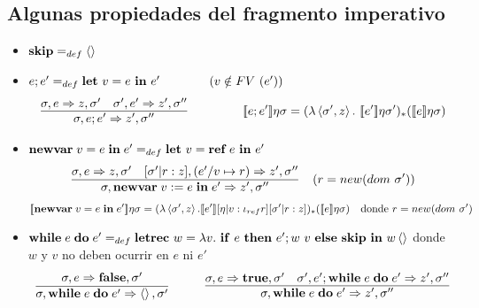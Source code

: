     \subsection{Algunas propiedades del fragmento imperativo}
    \begin{itemize}
      \item $\textbf{skip} =_{def} \left\langle \right\rangle$
      \item $e;e' =_{def} \textbf{let}\ v=e \ \mathbf{in}\  e'\qquad\qquad(v\notin FV\ (e'))$
        \begin{eqnarray*}
          \begin{array}{c}
            \underline{\s,e \Rightarrow z,\s'\quad \s',e' \Rightarrow z',\s''}\\
            \s, e;e' \Rightarrow z',\s''
            \end{array} \qquad \qquad 
            \se{e;e'}\eta\s = (\lambda \la\s',z\ra.\ \se{e'}\eta\s')_*(\se{e}\eta\s)
        \end{eqnarray*}
      \item $\newvar{v=e}{e'} =_{def} \textbf{let}\ v=\textbf{ref}\ e \ine e'$
        \[\begin{array}{c}
        \underline{\sigma,e \Rightarrow z,\sigma'\quad [\sigma'|r:z],(e'/v\mapsto r) \Rightarrow z',\sigma''}\\
        \sigma,\textbf{newvar}\;v:=e\;\textbf{in}\;e' \Rightarrow z',\sigma''
        \end{array}
        \ \ (r=new(dom\ \sigma'))
        \]
        \[
        [\![\textbf{newvar}\;v=e\;\textbf{in}\;e']\!]\eta\sigma = (\lambda \left\langle \sigma', z\right\rangle.[\![e']\!][\eta|v:\iota_{ref}r][\sigma'|r:z])_{*}([\![e]\!]\eta\sigma)\quad\text{donde } r = new(dom\  \sigma') 
        \]
      \item $\while e\do e' =_{def} \textbf{letrec}\ w=\lambda v.\ \ife e\thene e'; w \ v \elsee \textbf{skip} \ine w \la \ra$
      \PN donde $w$ y $v$ no deben ocurrir en $e$ ni $e'$
      \[\begin{array}{c}
        \s,e \Rightarrow \textbf{false},\s'\\
        \overline{\s, \while e\do e' \Rightarrow \la\ra,\s'}
        \end{array}
        \qquad
        \begin{array}{c}
        \underline{\s,e \Rightarrow \textbf{true},\s'\quad \s', e';\while e \do e' \Rightarrow z',\s''}\\
        \s, \while e \do e' \Rightarrow z',\s''
        \end{array}
        \]
    \end{itemize}

